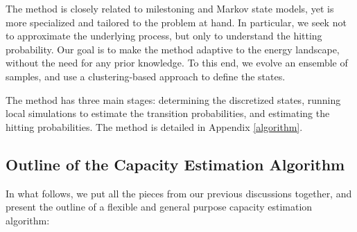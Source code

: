 \documentclass[english, aip, jcp, priprint, graphicx,floatfix]{revtex4-1}
\theoremstyle{plain}
\theoremstyle{definition}
\theoremstyle{plain}
\begin{document}
The method is closely related to milestoning\cite{West2007-cn, Bello-Rivas2015-ld, Aristoff2016-gc} and Markov state models\cite{Pande2010-yi, Chodera2014-bh, Husic2018-xp}, yet is more specialized and tailored to the problem at hand. In particular, we seek not to approximate the underlying process, but only to understand the hitting probability. Our goal is to make the method adaptive to the energy landscape, without the need for any prior knowledge. To this end, we evolve an ensemble of samples, and use a clustering-based approach to define the states.

The method has three main stages: determining the discretized states, running local simulations to estimate the transition probabilities, and estimating the hitting probabilities. The method is detailed in Appendix \ref{algorithm}.

\subsection{Outline of the Capacity Estimation Algorithm}

\label{sec:outlinecapacest}

In what follows, we put all the pieces from our previous discussions together, and present the outline of a flexible and general purpose capacity estimation algorithm:
\end{document}
